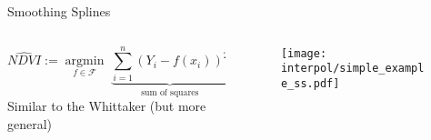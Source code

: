 \newcommand{\RobItPlot}{fitted to different (SCL45) NDVI {TS}. Iterations of a robustifing refit (as indicated in section~\ref{sec:loess_robustify}) are also displayed.}




\begin{frame}{Smoothing Splines}
    \begin{columns}
        \begin{column}{0.45\textwidth}
            $$\widehat{NDVI}  :=\underset{f \in \mathcal F}{\operatorname{argmin}}\;
                \underset{{\text{sum of squares}}}{\underbrace{{\sum_{i=1}^{n}\left(Y_{i}-{f}\left(x_{i}\right)\right)^{2} }}}
                + \lambda \underset{{\text{ smoothness}}}{\underbrace{{\int {f}^{\prime \prime}(x)^{2} d x}}}$$
            Similar to the Whittaker (but more general)
        
        \end{column}
        \begin{column}{0.45\textwidth}
            \begin{figure}
                \texttt{[image: interpol/simple\_example\_ss.pdf]}
            \end{figure}
        \end{column}
    \end{columns}
\end{frame}


